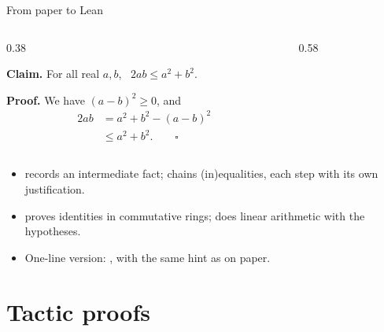 \documentclass[10pt, aspectratio=169]{beamer}
\begin{document}
\begin{frame}[fragile]{From paper to Lean}
\begin{columns}[T]
\begin{column}{0.38\textwidth}
\begin{paper}
\textbf{Claim.} For all real $a, b$, \ $2ab \le a^2 + b^2$.

\textbf{Proof.} We have $(a-b)^2 \ge 0$, and
\[
\begin{aligned}
2ab &= a^2 + b^2 - (a - b)^2\\
    &\le a^2 + b^2. \qquad\square
\end{aligned}
\]
\end{paper}
\end{column}
\begin{column}{0.58\textwidth}
\leanlabel
{}
\end{column}
\end{columns}

\vspace{0.1em}
\begin{itemize}
\item {} records an intermediate fact;  chains (in)equalities, each step with its own justification.
\item {} proves identities in commutative rings;  does linear arithmetic with the hypotheses.
\item One-line version: , with the same hint as on paper.
\end{itemize}
\end{frame}

\section{Tactic proofs}
\end{document}
